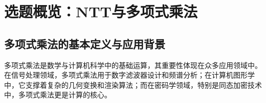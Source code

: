 \documentclass[a4paper]{article}
\begin{document}
\begin{abstract}
多项式乘法是同态加密、数字信号处理等领域的核心算子，而数论变换（NTT）是将其复杂度从 $O(n^2)$ 降至 $O(n\log n)$ 的关键算法。本报告以"写对 \rightarrow 写快 \rightarrow 写稳"为主线，系统梳理了 SIMD、OpenMP、MPI、CUDA 四级并行优化的完整技术栈，并最终构建了一个可插拔的统一框架，支持三种模运算实现（朴素、Montgomery、Barrett）与四种并行策略（串行、OpenMP、MPI、GPU）的任意组合。

首先，我们在 SIMD 实验中通过 ARM NEON 向量化与 Montgomery 规约实现了 1 448 倍的加速，为后续并行化奠定了高效标量内核。随后，OpenMP 多线程实验在中等规模数据上实现 2–3 倍加速，并借助线程池抽象沉淀了"数据依赖与任务粒度"并行化范式；MPI 实验则验证了 CRT 划分在分布式场景下的可行性，虽然受限于单机环境未能带来速度提升，却为 u64 精度扩展提供了设计样板；GPU 实验通过"线程级蝶形 + 共享内存 + 预计算旋转因子"把运行时间压缩到微秒级，在 $n=131072$ 时较串行快 6.5 倍。

统一性能测试显示：GPU 始终是大规模数据的首选；OpenMP 在 $1024<n\le8192$ 区间性价比最高；串行 Montgomery 适合 $n\le1024$ 的小数据；MPI 当前实现仅用于展示算法间差异。基于此，我们提出了一套动态调度策略，可根据数据规模自动切换最优实现。

尾声部分回顾了各实验的技术收获与遗憾，沉淀出"依赖分析—层次优化—工程可维护"三条方法论，并展望了 radix-4/8 NTT、分布式 GPU 集群与自动参数调优等未来方向。实验结果证明，面向硬件特性与算法结构的协同优化，能为高性能多项式乘法提供数量级的性能提升。
\end{abstract}

\clearpage
\tableofcontents
\newpage

\section{选题概览：NTT与多项式乘法}

\subsection{多项式乘法的基本定义与应用背景}


多项式乘法是数学与计算机科学中的基础运算，其重要性体现在众多应用领域中。在信号处理领域，多项式乘法用于数字滤波器设计和频谱分析；在计算机图形学中，它支撑着复杂的几何变换和渲染算法；而在密码学领域，特别是同态加密技术中，多项式乘法更是计算的核心。
\end{document}
